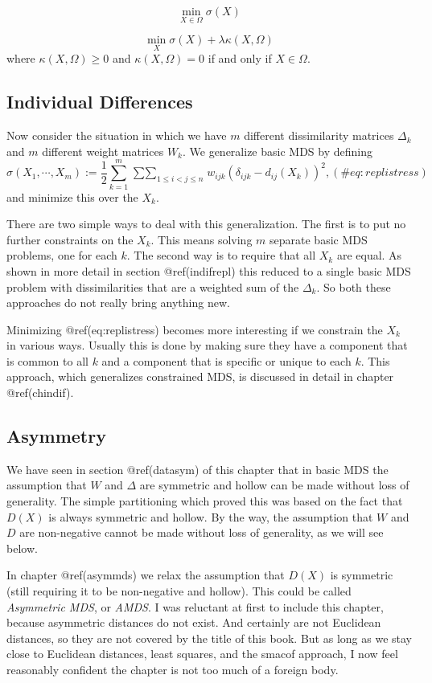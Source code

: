 \documentclass[
  12pt,
  letterpaper,
  DIV=11,
  numbers=noendperiod]{scrartcl}
\begin{document}
\[
\min_{X\in\Omega}\sigma(X)
\]

\[
\min_X\sigma(X)+\lambda\kappa(X,\Omega)
\] where \(\kappa(X,\Omega)\geq 0\) and \(\kappa(X,\Omega)=0\) if and
only if \(X\in\Omega\).

\subsection{Individual Differences}\label{inreplic}

Now consider the situation in which we have \(m\) different
dissimilarity matrices \(\Delta_k\) and \(m\) different weight matrices
\(W_k\). We generalize basic MDS by defining \begin{equation}
\sigma(X_1,\cdots,X_m):=\frac12\sum_{k=1}^m\mathop{\sum\sum}_{1\leq i<j\leq n}w_{ijk}(\delta_{ijk}-d_{ij}(X_k))^2,
(\#eq:replistress)
\end{equation} and minimize this over the \(X_k\).

There are two simple ways to deal with this generalization. The first is
to put no further constraints on the \(X_k\). This means solving \(m\)
separate basic MDS problems, one for each \(k\). The second way is to
require that all \(X_k\) are equal. As shown in more detail in section
@ref(indifrepl) this reduced to a single basic MDS problem with
dissimilarities that are a weighted sum of the \(\Delta_k\). So both
these approaches do not really bring anything new.

Minimizing @ref(eq:replistress) becomes more interesting if we constrain
the \(X_k\) in various ways. Usually this is done by making sure they
have a component that is common to all \(k\) and a component that is
specific or unique to each \(k\). This approach, which generalizes
constrained MDS, is discussed in detail in chapter @ref(chindif).

\subsection{Asymmetry}\label{genasym}

We have seen in section @ref(datasym) of this chapter that in basic MDS
the assumption that \(W\) and \(\Delta\) are symmetric and hollow can be
made without loss of generality. The simple partitioning which proved
this was based on the fact that \(D(X)\) is always symmetric and hollow.
By the way, the assumption that \(W\) and \(D\) are non-negative cannot
be made without loss of generality, as we will see below.

In chapter @ref(asymmds) we relax the assumption that \(D(X)\) is
symmetric (still requiring it to be non-negative and hollow). This could
be called \emph{Asymmetric MDS}, or \emph{AMDS}. I was reluctant at
first to include this chapter, because asymmetric distances do not
exist. And certainly are not Euclidean distances, so they are not
covered by the title of this book. But as long as we stay close to
Euclidean distances, least squares, and the smacof approach, I now feel
reasonably confident the chapter is not too much of a foreign body.
\end{document}
